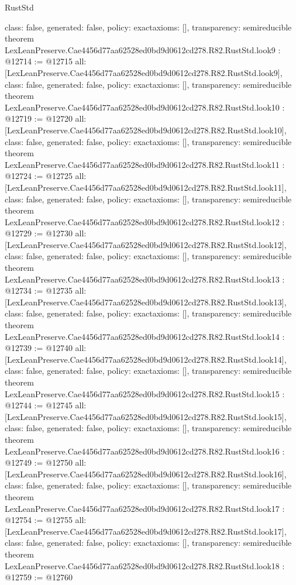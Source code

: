 \begin{lexlean}{RustStd}
\begin{coremodule}
{  class: false,
  generated: false,
  policy: exact{axioms: []},
  transparency: semireducible
}
theorem LexLeanPreserve.Cae4456d77aa62528ed0bd9d0612cd278.R82.RustStd.look9 : @12714 := @12715 {
  all: [LexLeanPreserve.Cae4456d77aa62528ed0bd9d0612cd278.R82.RustStd.look9],
  class: false,
  generated: false,
  policy: exact{axioms: []},
  transparency: semireducible
}
theorem LexLeanPreserve.Cae4456d77aa62528ed0bd9d0612cd278.R82.RustStd.look10 : @12719 := @12720 {
  all: [LexLeanPreserve.Cae4456d77aa62528ed0bd9d0612cd278.R82.RustStd.look10],
  class: false,
  generated: false,
  policy: exact{axioms: []},
  transparency: semireducible
}
theorem LexLeanPreserve.Cae4456d77aa62528ed0bd9d0612cd278.R82.RustStd.look11 : @12724 := @12725 {
  all: [LexLeanPreserve.Cae4456d77aa62528ed0bd9d0612cd278.R82.RustStd.look11],
  class: false,
  generated: false,
  policy: exact{axioms: []},
  transparency: semireducible
}
theorem LexLeanPreserve.Cae4456d77aa62528ed0bd9d0612cd278.R82.RustStd.look12 : @12729 := @12730 {
  all: [LexLeanPreserve.Cae4456d77aa62528ed0bd9d0612cd278.R82.RustStd.look12],
  class: false,
  generated: false,
  policy: exact{axioms: []},
  transparency: semireducible
}
theorem LexLeanPreserve.Cae4456d77aa62528ed0bd9d0612cd278.R82.RustStd.look13 : @12734 := @12735 {
  all: [LexLeanPreserve.Cae4456d77aa62528ed0bd9d0612cd278.R82.RustStd.look13],
  class: false,
  generated: false,
  policy: exact{axioms: []},
  transparency: semireducible
}
theorem LexLeanPreserve.Cae4456d77aa62528ed0bd9d0612cd278.R82.RustStd.look14 : @12739 := @12740 {
  all: [LexLeanPreserve.Cae4456d77aa62528ed0bd9d0612cd278.R82.RustStd.look14],
  class: false,
  generated: false,
  policy: exact{axioms: []},
  transparency: semireducible
}
theorem LexLeanPreserve.Cae4456d77aa62528ed0bd9d0612cd278.R82.RustStd.look15 : @12744 := @12745 {
  all: [LexLeanPreserve.Cae4456d77aa62528ed0bd9d0612cd278.R82.RustStd.look15],
  class: false,
  generated: false,
  policy: exact{axioms: []},
  transparency: semireducible
}
theorem LexLeanPreserve.Cae4456d77aa62528ed0bd9d0612cd278.R82.RustStd.look16 : @12749 := @12750 {
  all: [LexLeanPreserve.Cae4456d77aa62528ed0bd9d0612cd278.R82.RustStd.look16],
  class: false,
  generated: false,
  policy: exact{axioms: []},
  transparency: semireducible
}
theorem LexLeanPreserve.Cae4456d77aa62528ed0bd9d0612cd278.R82.RustStd.look17 : @12754 := @12755 {
  all: [LexLeanPreserve.Cae4456d77aa62528ed0bd9d0612cd278.R82.RustStd.look17],
  class: false,
  generated: false,
  policy: exact{axioms: []},
  transparency: semireducible
}
theorem LexLeanPreserve.Cae4456d77aa62528ed0bd9d0612cd278.R82.RustStd.look18 : @12759 := @12760 {
}
\end{coremodule}
\end{lexlean}
